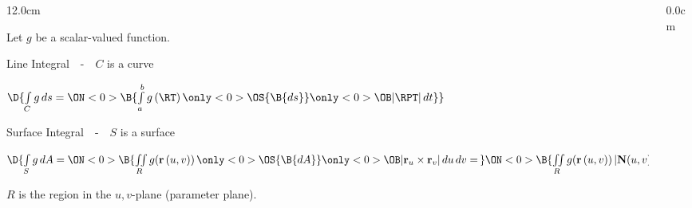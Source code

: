 \begin{frame}
\begin{columns}\begin{column}{12.0cm}
\scriptsize

\vspace{0.2cm}

Let $g$ be a scalar-valued function.

\vspace{0.7cm}

Line Integral \,\, - \,\, $C$ is a curve

\begin{center}
	$\D{\int \limits_{C} g \, ds = 
	\ON<0>{\B{\int \limits_{a}^{b} g\,(\RT)\, 
	\only<0>{\OS{\B{ ds }}}{
	\only<0>{\OB}{ |\RPT| \, dt }}}}}$
\end{center}

\vspace{0.2cm}

Surface Integral \,\, - \,\, $S$ is a surface

\begin{center}
	$\D{\int \limits_{S} g \, dA = 
	\ON<0>{\B{\iint \limits_{R} g({\bf r}\,(u,v)) \, \only<0>{\OS{\B{ dA }}}{\only<0>{\OB}{ |{\bf r}_u \times {\bf r}_v| \, du \, dv }} = \,}}
	\ON<0>{\B{\iint \limits_{R} g({\bf r}\,(u,v)) \, |{\bf N}(u,v)| \, du \, dv}}}$
\end{center}

\vspace{0.5cm}

$R$ is the region in the $u,v$-plane (parameter plane).

\vspace{1.2cm}

\end{column}\begin{column}{0.0cm}\end{column}\end{columns}
\end{frame}

